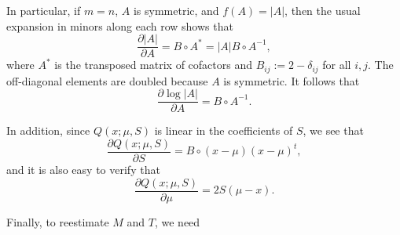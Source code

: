 \documentclass[12pt,leqno]{article}
\begin{document}
In particular, if $m=n$, $A$ is symmetric, and $f(A) = |A|$,  then the usual expansion 
in minors along each row shows that 
$$
\frac{\partial{|A|}}{\partial{A}} = B\circ{A}^* = |A|B\circ{A}^{-1},
$$
where $A^*$ is the transposed matrix of cofactors and $B_{ij} := 2-\delta_{ij}$ for all $i,j$.
The off-diagonal elements are doubled because $A$ is symmetric.
It follows that
\begin{equation}\label{partial_logdet}
  \frac{\partial{\log|A|}}{\partial{A}} = B\circ{A}^{-1}. 
\end{equation}

In addition, since $Q(x;\mu,S)$ is linear in the coefficients of $S$, we see that
\begin{equation}\label{dQ_dS}
\frac{\partial{Q(x;\mu,S)}}{\partial{S}} = B\circ(x-\mu)(x-\mu)^t,
\end{equation}
and it is also easy to verify that
\begin{equation}\label{dQ_dmu}
\frac{\partial{Q(x;\mu,S)}}{\partial{\mu}} = 2S(\mu-x).
\end{equation}

Finally, to reestimate $M$ and $T$, we need
\end{document}
